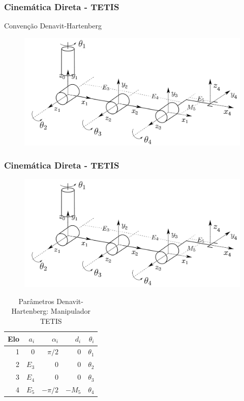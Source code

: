 \documentclass{beamer}
\begin{document}
\begin{frame}
\frametitle{Cinemática Direta - TETIS}
Convenção Denavit-Hartenberg
\begin{figure}
\includegraphics[width=0.8\linewidth]{./img/model2.png}
\end{figure}
\end{frame}

\begin{frame}
\frametitle{Cinemática Direta - TETIS}

\begin{figure}
\includegraphics[width=0.5\linewidth]{./img/model2.png}
\end{figure}

\begin{table}
\begin{tabular}{rrrrr} 	
\toprule
Elo & $a_i$ & $\alpha_i$ & $d_i$  & $\theta_i$ \\ 
\midrule
1   & 0     & $\pi/2$    & 0      & $\theta_1$ \\
2   & $E_3$ & 0          & 0      & $\theta_2$ \\
3   & $E_4$ & 0          & 0      & $\theta_3$ \\
4   & $E_5$ & $-\pi/2$   & $-M_5$ & $\theta_4$ \\ 
\bottomrule
\end{tabular}
\caption{Parâmetros Denavit-Hartenberg: Manipulador TETIS}
\end{table}
\end{frame}
\end{document}
